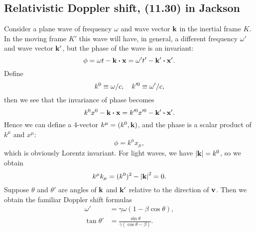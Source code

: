 \documentclass[10pt]{article}
\begin{document}
\subsection{Relativistic Doppler shift, (11.30) in Jackson}
Consider a plane wave of frequency $\omega$ and wave vector $\vb{k}$ in the inertial frame $K$. In the moving frame $K'$ this wave will have, in general, a different frequency $\omega'$ and wave vector $\vb{k'}$, but the phase of the wave is an invariant:
\begin{equation}
	\phi = \omega t - \vb{k} \vdot \vb{x} = \omega' t' - \vb{k'} \vdot \vb{x'}.
\end{equation}
Define
\begin{equation}
	k^0 \equiv \omega / c\qc k'^0 \equiv \omega' / c,
\end{equation}
then we see that the invariance of phase becomes
\begin{equation}
	k^0 x^0 - \vb{k} \vdot \vb{x} = k'^0 x'^0 - \vb{k'} \vdot \vb{x'}.
\end{equation}
Hence we can define a 4-vector $k^{\mu} = (k^0, \vb{k})$, and the phase is a scalar product of $k^{\mu}$ and $x^{\mu}$:
\begin{equation}
	\phi = k^{\mu} x_{\mu},
\end{equation}
which is obviously Lorentz invariant. For light waves, we have $\abs{\vb{k}} = k^0$, so we obtain
\begin{equation}
	k^{\mu} k_{\mu} = (k^0)^2 - \abs{\vb{k}}^2 = 0.
\end{equation}
Suppose $\theta$ and $\theta'$ are angles of $\vb{k}$ and $\vb{k'}$ relative to the direction of $\vb{v}$. Then we obtain the familiar Doppler shift formulas
\begin{align*}
	\omega' &= \gamma \omega (1 - \beta \cos{\theta}), \\
	\tan{\theta'} &= \frac{\sin{\theta}}{\gamma (\cos{\theta - \beta})}.
\end{align*}
\end{document}
